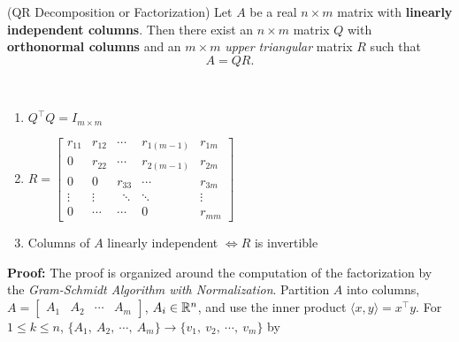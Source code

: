 \begin{thm}
(QR Decomposition or Factorization)
Let $A$ be a real $n \times m$ matrix with \textbf{linearly independent columns}. Then there exist an $n \times m$ matrix $Q$ with \textbf{orthonormal columns} and an $m \times m$ \emph{upper triangular}  matrix $R$ such that
    \begin{equation*}
        A=QR.
    \end{equation*}
\end{thm}
\begin{rem} \mbox{ }
   \begin{enumerate}
	    \item $Q^\top Q=I_{m \times m}$
	    \item 
	        $R=\left[\begin{array}{ccrcr} r_{11} & r_{12} & \cdots & r_{1(m-1)} & r_{1m}\\ 
	        0 & r_{22} & \cdots & r_{2(m-1)} & r_{2m}\\
	         0 & 0 & r_{33} & \cdots & r_{3m} \\
	         \vdots & \vdots & ~~\ddots & \ddots & \vdots \\
	       0 & \cdots & \cdots & 0~~~ & r_{mm} \end{array}\right]$
	    \item Columns of $A$ linearly independent $\iff R$ is invertible
    \end{enumerate} 
\end{rem}

\textbf{Proof:} The proof is organized around the computation of the factorization by the \emph{Gram-Schmidt Algorithm with Normalization}. Partition $A$ into columns, $A= \left[\begin{array}{cccc} A_1 & A_2 & \cdots & A_m \end{array}\right]$, $A_i\in\mathbb R^n$, and use the inner product $\langle x,y\rangle=x^\top y$.
        For $1\leq k\leq n$, $\{A_1,\ A_2,\ \dotsb ,\ A_m\}\rightarrow \{v_1,\ v_2,\ \dotsb ,\ v_m\}$ by 
        \\
        
